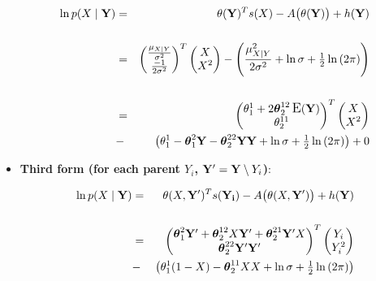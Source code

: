 \documentclass[11pt, oneside]{article}   	%
\DeclareMathOperator*{\E}{\mbox{\large E}}
\numberwithin{figure}{section}
\numberwithin{equation}{section}
\numberwithin{table}{section}
\theoremstyle{definition}
\begin{document}
\begin{appendices}
\begin{itemize}
\begin{eqnarray*}
\ln p(X\mid \mathbf{Y}) &=& \theta(\mathbf{Y})^T s(X) - A \big(\theta(\mathbf{Y})\big) + h(\mathbf{Y})\\\\
&=&
\begin{pmatrix}
\frac{\mu_{X|Y}}{\sigma^2}\\
\frac{-1}{2\sigma^2}\\
\end{pmatrix}^T
\begin{pmatrix}
X\\
X^2\\
\end{pmatrix}
- \left(\frac{\mu_{X|Y}^2}{2\sigma^2} + \ln{\sigma} + \tfrac{1}{2}\ln{(2\pi)}\right) \\\\
&=&
\begin{pmatrix}
\theta_1^1+2\thb_2^{12} \E(\Y)\\
\theta_2^{11}\\
\end{pmatrix}^T
\begin{pmatrix}
X\\
X^2\\
\end{pmatrix}\\
&-& 
\left(\theta_1^1 - \thb_1^2 \Y - \thb_2^{22}\Y\Y + \ln{\sigma} + \tfrac{1}{2}\ln{(2\pi)}\right) + 0 \\
\end{eqnarray*}



\vspace{0.2in}
\item \textbf{Third form (for each parent $Y_i$, $\mathbf Y' = \mathbf Y \setminus Y_i $)}: 

\begin{eqnarray*}
\ln p(X\mid \mathbf{Y}) &=& \theta(X,\mathbf Y')^T s(\mathbf{Y_i}) - A \big(\theta(X,\mathbf Y') \big) + h(\mathbf{Y})\\\\
&=&
\begin{pmatrix}
\boldsymbol \theta_1^2 \mathbf Y' + \boldsymbol \theta_2^{12}X\mathbf Y' + \boldsymbol \theta_2^{21}\mathbf Y'X\\
\boldsymbol \theta_2^{22}\mathbf Y'\mathbf Y' 
\end{pmatrix}^T
\begin{pmatrix}
Y_i\\
Y_i^2\\
\end{pmatrix}\\
&-& \left(\theta_1^1(1-X) - \boldsymbol \theta_2^{11}XX + \ln{\sigma} + \tfrac{1}{2}\ln{(2\pi)} \right)
\end{eqnarray*}


\end{itemize}
\end{appendices}
\end{document}
